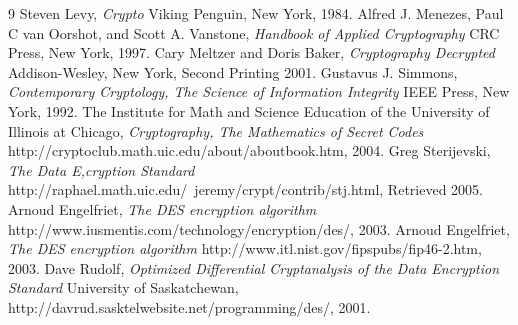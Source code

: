 \documentclass[12pt ]{report}
\begin{document}
\begin{thebibliography} {9}
	  Steven Levy,
	  \emph{Crypto}
	  Viking Penguin, New York,
	  1984.
	  Alfred J. Menezes, Paul C van Oorshot, and Scott A. Vanstone,
	  \emph{Handbook of Applied Cryptography}
	  CRC Press, New York,
	  1997.
	  Cary Meltzer and Doris Baker,
	  \emph{Cryptography Decrypted}
	  Addison-Wesley, New York,
	  Second Printing
	  2001.
	  Gustavus J. Simmons,
	  \emph{Contemporary Cryptology, The Science of Information Integrity}
	  IEEE Press, New York,
	  1992.
	  The Institute for Math and Science Education of the University of Illinois at Chicago,
	  \emph{Cryptography, The Mathematics of Secret Codes}
	  http://cryptoclub.math.uic.edu/about/aboutbook.htm,
	  2004.
	  Greg Sterijevski,
	  \emph{The Data E,cryption Standard}
	  http://raphael.math.uic.edu/~jeremy/crypt/contrib/stj.html,
	  Retrieved 2005.
	  Arnoud Engelfriet,
	  \emph{The DES encryption algorithm}
	  http://www.iusmentis.com/technology/encryption/des/,
	  2003.
	  Arnoud Engelfriet,
	  \emph{The DES encryption algorithm}
	  http://www.itl.nist.gov/fipspubs/fip46-2.htm,
	  2003.
	  Dave Rudolf,
	  \emph{Optimized Differential Cryptanalysis of the Data Encryption Standard}
	  University of Saskatchewan, http://davrud.sasktelwebsite.net/programming/des/,
	  2001.
\end{thebibliography}
\end{document}
